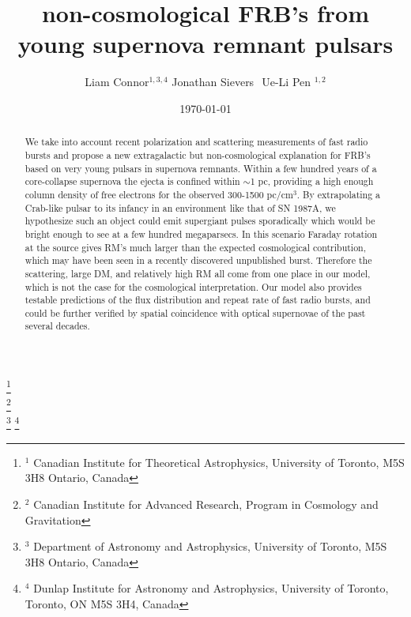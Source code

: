 \documentclass[useAMS,usenatbib]{emulateapj}
\begin{document}
\title{non-cosmological FRB's from young supernova remnant pulsars}
\author{
Liam Connor$^{1, 3, 4}$
Jonathan Sievers $^{}$
Ue-Li Pen $^{1, 2}$
}
\date{\today}

%
%

\begin{abstract}
We take into account recent polarization and scattering measurements of fast radio bursts
and propose a new extragalactic but non-cosmological explanation for FRB's based on
very young pulsars in supernova remnants. Within a few hundred years of a 
core-collapse supernova the ejecta 
is confined within $\sim$1 pc, providing a high enough column density of free electrons 
for the observed 300-1500 pc/cm$^3$. By extrapolating a Crab-like pulsar to 
its infancy in an environment like that of SN 1987A, 
we hypothesize such an object could emit supergiant pulses sporadically which 
would be bright enough to see at a few hundred megaparsecs. In this scenario Faraday
rotation at the source gives RM's much larger than the expected cosmological contribution,
which may have been seen in a recently discovered unpublished burst. Therefore the scattering,
large DM, and relatively high RM all come from one place in our model,
 which is not the case for the cosmological
interpretation. Our model also provides
testable predictions of the flux distribution and repeat rate of fast radio bursts, and could be further
verified by spatial coincidence with optical supernovae of the past several decades. 

\end{abstract}

\footnote{$^1$ Canadian Institute for Theoretical Astrophysics, University of Toronto, M5S 3H8 Ontario, Canada} \\
\footnote{$^2$ Canadian Institute for Advanced Research, Program in Cosmology
and Gravitation}\\
\footnote{$^3$ Department of Astronomy and Astrophysics, University of Toronto, 
M5S 3H8 Ontario, Canada}
\footnote{$^4$ Dunlap Institute for Astronomy and Astrophysics, University of Toronto,
Toronto, ON M5S 3H4, Canada}


\newcommand{\be}{\begin{eqnarray}}
\newcommand{\ee}{\end{eqnarray}}
\newcommand{\beq}{\begin{equation}}
\newcommand{\eeq}{\end{equation}}
\end{document}
